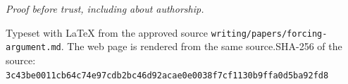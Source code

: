 \documentclass[11pt]{article}
\begin{document}
\emph{Proof before trust, including about authorship.}

\vfill{\footnotesize Typeset with LaTeX from the approved source \texttt{writing/papers/forcing-argument.md}. The web page is rendered from the same source.\newline SHA-256 of the source: \texttt{3c43be0011cb64c74e97cdb2bc46d92acae0e0038f7cf1130b9ffa0d5ba92fd8}\par}
\end{document}
